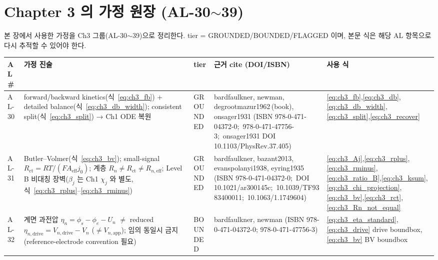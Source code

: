 \documentclass[11pt,a4paper]{article}
\newcommand{\eff}{\mathrm{eff}}
\newcommand{\app}{\mathrm{app}}
\newcommand{\drive}{\mathrm{drive}}
\newcommand{\ct}{\mathrm{ct}}
\newcommand{\brk}{\discretionary{}{}{}}%
\begin{document}
\section{Chapter 3 의 가정 원장 (AL-30$\sim$39)}\label{sec:ch3_al}
본 장에서 사용한 가정을 Ch3 그룹(AL-30$\sim$39)으로 정리한다. tier = GROUNDED/BOUNDED/FLAGGED 이며,
본문 식은 해당 AL 항목으로 다시 추적할 수 있어야 한다.
{\footnotesize
\setlength{\tabcolsep}{3pt}
\sloppy
\begin{longtable}{>{\raggedright\arraybackslash}p{} >{\raggedright\arraybackslash}p{} >{\raggedright\arraybackslash}p{} >{\raggedright\arraybackslash}p{} >{\raggedright\arraybackslash}p{}}
\toprule AL\# & 가정 진술 & tier & 근거 cite (DOI/ISBN) & 사용 식 \\ \midrule \endhead
AL-30 & forward/backward kinetics(식~\eqref{eq:ch3_fb}) + detailed balance(식~\eqref{eq:ch3_db_width}); consistent split(식~\eqref{eq:ch3_split}) → Ch1 ODE 복원 & GROUNDED & bardfaulkner, newman, degrootmazur1962\,(book), onsager1931 (ISBN 978-0-\brk 471-04372-0;\brk\ 978-0-\brk 471-47756-3;\brk\ onsager1931 DOI 10.1103/\brk PhysRev.37.405) & \eqref{eq:ch3_fb},\allowbreak\eqref{eq:ch3_db},\allowbreak\eqref{eq:ch3_db_width},\allowbreak\eqref{eq:ch3_split},\allowbreak\eqref{eq:ch3_recover} \\
AL-31 & Butler--Volmer(식~\eqref{eq:ch3_bv}); small-signal $R_\ct{=}RT/(FA_\eff j_0)$; 계층 $R_n{\ne}R_\ct{\ne}R_{n,\eff}$; Level B 비대칭 장벽($\beta_j$ 는 Ch1 $\chi_j$ 와 별도, 식~\eqref{eq:ch3_rplus}--\eqref{eq:ch3_rminus}) & GROUNDED & bardfaulkner, bazant2013, evanspolanyi1938, eyring1935 (ISBN 978-0-\brk 471-04372-0;\brk\ DOI 10.1021/\brk ar300145c;\brk\ 10.1039/\brk TF9383400011;\brk\ 10.1063/\brk 1.1749604) & \eqref{eq:ch3_Aj},\allowbreak\eqref{eq:ch3_rplus},\allowbreak\eqref{eq:ch3_rminus},\allowbreak\eqref{eq:ch3_ratio_B},\allowbreak\eqref{eq:ch3_ksum},\allowbreak\eqref{eq:ch3_chi_projection},\allowbreak\eqref{eq:ch3_bv},\allowbreak\eqref{eq:ch3_rct},\allowbreak\eqref{eq:ch3_Rn_not_equal} \\
AL-32 & 계면 과전압 $\eta_n=\phi_s-\phi_e-U_n$ $\ne$ reduced $\eta_{n,\drive}=V_{n,\drive}-V_n$ ($\ne V_{n,\app}$); 임의 동일시 금지(reference-electrode convention 필요) & BOUNDED & bardfaulkner, newman (ISBN 978-0-\brk 471-04372-0; 978-0-\brk 471-47756-3) & \eqref{eq:ch3_eta_standard},\allowbreak\eqref{eq:ch3_drive} drive boundbox, \eqref{eq:ch3_bv} BV boundbox \\

\end{longtable}}
\end{document}
